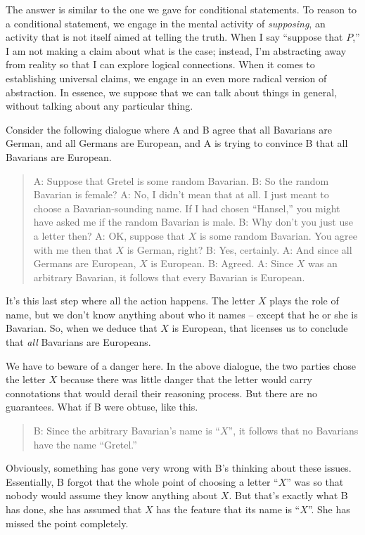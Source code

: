 The answer is similar to the one we gave for conditional statements.
To reason to a conditional statement, we engage in the mental activity
of {\it supposing}, an activity that is not itself aimed at telling
the truth.  When I say ``suppose that $P$,'' I am not making a claim
about what is the case; instead, I'm abstracting away from reality so
that I can explore logical connections.  When it comes to
establishing universal claims, we engage in an even more radical
version of abstraction.  In essence, we suppose that we can talk about
things in general, without talking about any particular thing.

Consider the following dialogue where A and B agree that all Bavarians
are German, and all Germans are European, and A is trying to convince
B that all Bavarians are European.

\begin{quote} A: Suppose that Gretel is some random Bavarian. \newline
  B: So the random Bavarian is female?  \newline
  A: No, I didn't mean that at all.  I just meant to choose a
  Bavarian-sounding name.  If I had chosen ``Hansel,'' you might have
  asked me if the random Bavarian is male. \newline
  B: Why don't you just use a letter then? \newline
  A: OK, suppose that $X$ is some random Bavarian.  
  You agree with me then that $X$ is German, right?  \newline
  B: Yes, certainly.  \newline
  A: And since all Germans are European, $X$ is European.
  \newline
  B: Agreed. \newline
  A: Since $X$ was an arbitrary Bavarian, it follows that every Bavarian is European.  \end{quote}

It's this last step where all the action happens.  The letter $X$
plays the role of name, but we don't know anything about who it names
-- except that he or she is Bavarian.  So, when we deduce that $X$ is
European, that licenses us to conclude that {\it all} Bavarians are
Europeans.

We have to beware of a danger here.  In the above dialogue, the two
parties chose the letter $X$ because there was little danger that the
letter would carry connotations that would derail their reasoning
process.  But there are no guarantees.  What if B were obtuse, like this.
\begin{quote}
  B: Since the arbitrary Bavarian's name is ``$X$'', it follows that no
  Bavarians have the name ``Gretel.'' \end{quote} Obviously, something
has gone very wrong with B's thinking about these issues.
Essentially, B forgot that the whole point of choosing a letter ``$X$''
was so that nobody would assume they know anything about $X$.  But
that's exactly what B has done, she has assumed that $X$ has the
feature that its name is ``$X$''.  She has missed the point
completely.

